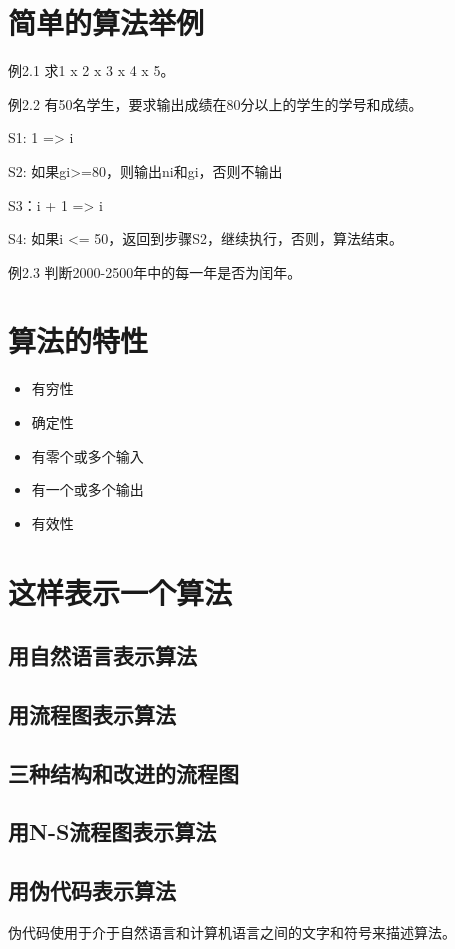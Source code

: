 \section{简单的算法举例}

例2.1 求1 x 2 x 3 x 4 x 5。

例2.2 有50名学生，要求输出成绩在80分以上的学生的学号和成绩。

S1: 1 => i

S2: 如果gi>=80，则输出ni和gi，否则不输出

S3：i + 1 => i

S4: 如果i <= 50，返回到步骤S2，继续执行，否则，算法结束。

例2.3 判断2000-2500年中的每一年是否为闰年。

\section{算法的特性}
\begin{itemize}
	\item 有穷性
	\item 确定性
	\item 有零个或多个输入
	\item 有一个或多个输出
	\item 有效性
\end{itemize}

\section{这样表示一个算法}
\subsection{用自然语言表示算法}
\subsection{用流程图表示算法}
\subsection{三种结构和改进的流程图}
\subsection{用N-S流程图表示算法}
\subsection{用伪代码表示算法}

伪代码使用于介于自然语言和计算机语言之间的文字和符号来描述算法。

